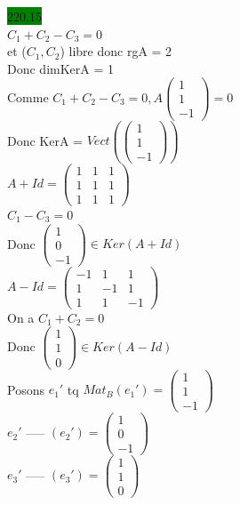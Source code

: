 \documentclass{article}
\begin{document}
\noindent \colorbox{green}{220.15}\\
\(C_1 + C_2 - C_3 = 0\)\\
et (\(C_1, C_2\)) libre donc rgA = 2\\
Donc dimKerA = 1\\
Comme \(C_1 + C_2 - C_3 = 0, A\begin{pmatrix}
    1\\1\\-1
\end{pmatrix}=0\)\\
Donc KerA = \(Vect(\begin{pmatrix}
    1\\1\\-1
\end{pmatrix})\)\\
\(A+Id=\begin{pmatrix}
    1&1&1\\1&1&1\\1&1&1 
\end{pmatrix}\)\\
\(C_1 -C_3 = 0\)\\
Donc \(\begin{pmatrix}
    1\\0\\-1
\end{pmatrix} \in Ker(A+Id)\)\\
\(A-Id = \begin{pmatrix}
    -1&1&1\\1&-1&1\\1&1&-1
\end{pmatrix}\)\\
On a \(C_1 + C_2 = 0\)\\
Donc \(\begin{pmatrix}
    1\\1\\0
\end{pmatrix} \in Ker(A-Id)\)\\
Posons \(e_1'\) tq \(Mat_B(e_1')=\begin{pmatrix}
    1\\1\\-1
\end{pmatrix}\)\\
\(e_2'\) ----- \((e_2') = \begin{pmatrix}
    1\\0\\-1
\end{pmatrix}\)\\
\(e_3'\) ----- \((e_3') = \begin{pmatrix}
    1\\1\\0
\end{pmatrix}\)\\
\end{document}
